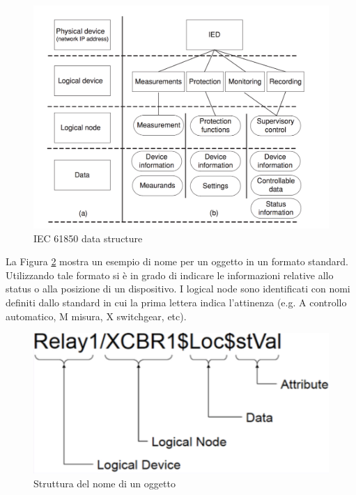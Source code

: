 \begin{figure}[h]
	\centering
	\includegraphics[scale=0.350]{imgs/iec61850ds.png}
	\caption{IEC 61850 data structure} \label{fig:iec61850ds}
\end{figure}\newpage
La Figura \ref{fig:name_obj} mostra un esempio di nome per un oggetto in un formato standard. Utilizzando tale formato si è in grado di indicare le informazioni relative allo status o alla posizione di un dispositivo. I logical node sono identificati con nomi definiti dallo standard in cui la prima lettera indica l'attinenza (e.g. A controllo automatico, M misura, X switchgear, etc).
\begin{figure}[h]
	\centering
	\includegraphics[scale=0.350]{imgs/name_obj.png}
	\caption{Struttura del nome di un oggetto} \label{fig:name_obj}
\end{figure}
\newline
